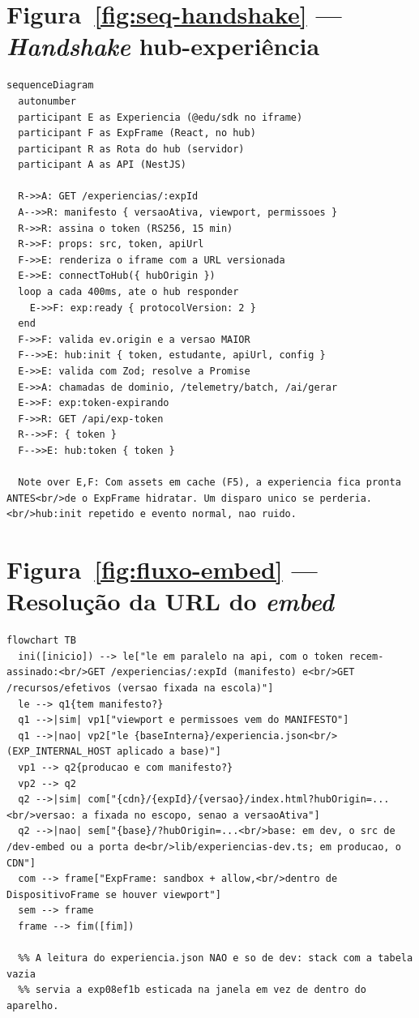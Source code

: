 \section{Figura~\ref{fig:seq-handshake} --- \emph{Handshake} hub-experiência}

\begin{lstlisting}[language=mermaid]
sequenceDiagram
  autonumber
  participant E as Experiencia (@edu/sdk no iframe)
  participant F as ExpFrame (React, no hub)
  participant R as Rota do hub (servidor)
  participant A as API (NestJS)

  R->>A: GET /experiencias/:expId
  A-->>R: manifesto { versaoAtiva, viewport, permissoes }
  R->>R: assina o token (RS256, 15 min)
  R->>F: props: src, token, apiUrl
  F->>E: renderiza o iframe com a URL versionada
  E->>E: connectToHub({ hubOrigin })
  loop a cada 400ms, ate o hub responder
    E->>F: exp:ready { protocolVersion: 2 }
  end
  F->>F: valida ev.origin e a versao MAIOR
  F-->>E: hub:init { token, estudante, apiUrl, config }
  E->>E: valida com Zod; resolve a Promise
  E->>A: chamadas de dominio, /telemetry/batch, /ai/gerar
  E->>F: exp:token-expirando
  F->>R: GET /api/exp-token
  R-->>F: { token }
  F-->>E: hub:token { token }

  Note over E,F: Com assets em cache (F5), a experiencia fica pronta ANTES<br/>de o ExpFrame hidratar. Um disparo unico se perderia.<br/>hub:init repetido e evento normal, nao ruido.
\end{lstlisting}

\section{Figura~\ref{fig:fluxo-embed} --- Resolução da URL do \emph{embed}}

\begin{lstlisting}[language=mermaid]
flowchart TB
  ini([inicio]) --> le["le em paralelo na api, com o token recem-assinado:<br/>GET /experiencias/:expId (manifesto) e<br/>GET /recursos/efetivos (versao fixada na escola)"]
  le --> q1{tem manifesto?}
  q1 -->|sim| vp1["viewport e permissoes vem do MANIFESTO"]
  q1 -->|nao| vp2["le {baseInterna}/experiencia.json<br/>(EXP_INTERNAL_HOST aplicado a base)"]
  vp1 --> q2{producao e com manifesto?}
  vp2 --> q2
  q2 -->|sim| com["{cdn}/{expId}/{versao}/index.html?hubOrigin=...<br/>versao: a fixada no escopo, senao a versaoAtiva"]
  q2 -->|nao| sem["{base}/?hubOrigin=...<br/>base: em dev, o src de /dev-embed ou a porta de<br/>lib/experiencias-dev.ts; em producao, o CDN"]
  com --> frame["ExpFrame: sandbox + allow,<br/>dentro de DispositivoFrame se houver viewport"]
  sem --> frame
  frame --> fim([fim])

  %% A leitura do experiencia.json NAO e so de dev: stack com a tabela vazia
  %% servia a exp08ef1b esticada na janela em vez de dentro do aparelho.
\end{lstlisting}

